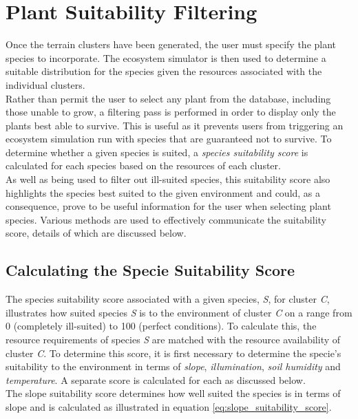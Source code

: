 \section{Plant Suitability Filtering} \label{sec:plant_suitability_filtering}

Once the terrain clusters have been generated, the user must specify the plant species to incorporate. The ecosystem simulator is then used to determine a suitable distribution for the species given the resources associated with the individual clusters.\\

Rather than permit the user to select any plant from the database, including those unable to grow, a filtering pass is performed in order to display only the plants best able to survive. This is useful as it prevents users from triggering an ecosystem simulation run with species that are guaranteed not to survive. To determine whether a given species is suited, a \textit{species suitability score} is calculated for each species based on the resources of each cluster. \\

As well as being used to filter out ill-suited species, this suitability score also highlights the species best suited to the given environment and could, as a consequence, prove to be useful information for the user when selecting plant species. Various methods are used to effectively communicate the suitability score, details of which are discussed below.

\subsection{Calculating the Specie Suitability Score}

The species suitability score associated with a given species, \textit{S}, for cluster \textit{C}, illustrates how suited species \textit{S} is to the environment of cluster \textit{C} on a range from 0 (completely ill-suited) to 100 (perfect conditions). To calculate this, the resource requirements of species \textit{S} are matched with the resource availability of cluster \textit{C}. To determine this score, it is first necessary to determine the specie's suitability to the environment in terms of \textit{slope}, \textit{illumination}, \textit{soil humidity} and \textit{temperature}. A separate score is calculated for each as discussed below.\\

The slope suitability score determines how well suited the species is in terms of slope and is calculated as illustrated in equation \ref{eq:slope_suitability_score}.\\

